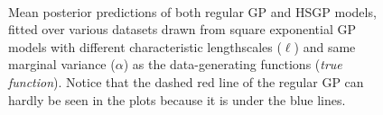 \documentclass[onecolumn,a4paper,11pt]{article}
\begin{document}
\begin{figure}
\\
\vspace{-3mm}
\caption{Mean posterior predictions of both regular GP and HSGP models, fitted over various datasets drawn from square exponential GP models with different characteristic lengthscales ($\ell$) and same marginal variance ($\alpha$) as the data-generating functions (\textit{true function}). Notice that the dashed red line of the regular GP can hardly be seen in the plots because it is under the blue lines.}
  \label{fig7_posterior_varing_lscale_part1}
\end{figure}
\end{document}
